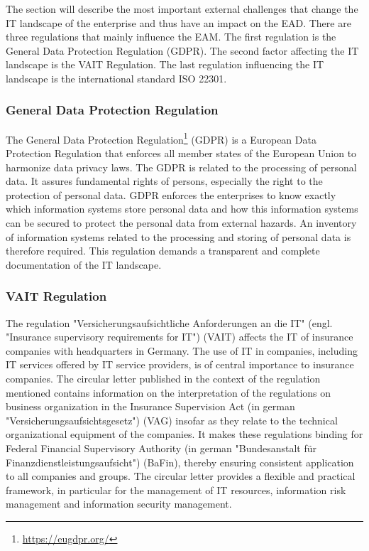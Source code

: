 The section will describe the most important external challenges that change the IT landscape of the enterprise and thus have an impact on the EAD. There are three regulations that mainly influence the EAM. The first regulation is the General Data Protection Regulation (GDPR). The second factor affecting the IT landscape is the VAIT Regulation. The last regulation influencing the IT landscape is the international standard ISO 22301.

\subsubsection{General Data Protection Regulation}

The General Data Protection Regulation\footnote{\url{https://eugdpr.org/}} (GDPR) is a European Data Protection Regulation that enforces all member states of the European Union to harmonize data privacy laws. The GDPR is related to the processing of personal data. It assures fundamental rights of  persons, especially the right to the protection of personal data. GDPR enforces the enterprises to know exactly which information systems store personal data and how this information systems can be secured to protect the personal data from external hazards. An inventory of information systems related to the processing and storing of personal data is therefore required. This regulation demands a transparent and complete documentation of the IT landscape.

\subsubsection{VAIT Regulation}

The regulation "Versicherungsaufsichtliche Anforderungen an die IT" (engl. "Insurance supervisory requirements for IT") (VAIT) affects the IT of insurance companies with headquarters in Germany. The use of IT in companies, including IT services offered by IT service providers, is of central importance to insurance companies. The circular letter published in the context of the regulation mentioned contains information on the interpretation of the regulations on business organization in the Insurance Supervision Act  (in german "Versicherungsaufsichtsgesetz") (VAG) insofar as they relate to the technical organizational equipment of the companies. It makes these regulations binding for Federal Financial Supervisory Authority (in german "Bundesanstalt für Finanzdienstleistungsaufsicht") (BaFin), thereby ensuring consistent application to all companies and groups. The circular letter provides a flexible and practical framework, in particular for the management of IT resources, information risk management and information security management. \cite{Anforderungen2018}


